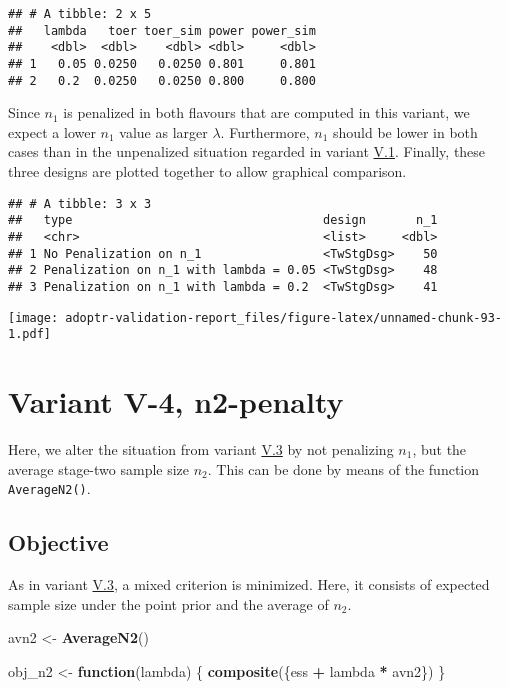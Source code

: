 \documentclass[
]{book}
\newenvironment{Shaded}{\begin{snugshade}}{\end{snugshade}}
\newcommand{\ControlFlowTok}[1]{\textcolor[rgb]{0.13,0.29,0.53}{\textbf{#1}}}
\newcommand{\KeywordTok}[1]{\textcolor[rgb]{0.13,0.29,0.53}{\textbf{#1}}}
\newcommand{\NormalTok}[1]{#1}
\newcommand{\OperatorTok}[1]{\textcolor[rgb]{0.81,0.36,0.00}{\textbf{#1}}}
\newcommand{\StringTok}[1]{\textcolor[rgb]{0.31,0.60,0.02}{#1}}
\begin{document}
\begin{verbatim}
## # A tibble: 2 x 5
##   lambda   toer toer_sim power power_sim
##    <dbl>  <dbl>    <dbl> <dbl>     <dbl>
## 1   0.05 0.0250   0.0250 0.801     0.801
## 2   0.2  0.0250   0.0250 0.800     0.800
\end{verbatim}

Since \(n_1\) is penalized in both flavours that are computed in this variant,
we expect a lower \(n_1\) value as larger \(\lambda\).
Furthermore, \(n_1\) should be lower in both cases than in the unpenalized
situation regarded in variant \protect\hyperlink{variantV_1}{V.1}.
Finally, these three designs are plotted together to allow graphical comparison.

\begin{verbatim}
## # A tibble: 3 x 3
##   type                                   design       n_1
##   <chr>                                  <list>     <dbl>
## 1 No Penalization on n_1                 <TwStgDsg>    50
## 2 Penalization on n_1 with lambda = 0.05 <TwStgDsg>    48
## 3 Penalization on n_1 with lambda = 0.2  <TwStgDsg>    41
\end{verbatim}

\texttt{[image: adoptr-validation-report\_files/figure-latex/unnamed-chunk-93-1.pdf]}

\hypertarget{variantV_4}{%
\section{Variant V-4, n2-penalty}\label{variantV_4}}

Here, we alter the situation from variant \protect\hyperlink{variantV_3}{V.3} by not penalizing
\(n_1\), but the average stage-two sample size \(n_2\).
This can be done by means of the function \texttt{AverageN2()}.

\hypertarget{objective-13}{%
\subsection{Objective}\label{objective-13}}

As in variant \protect\hyperlink{variantV_3}{V.3}, a mixed criterion is minimized.
Here, it consists of expected sample size under the point prior and the
average of \(n_2\).

\begin{Shaded}
\begin{Highlighting}[]
\NormalTok{avn2 <-}\StringTok{ }\KeywordTok{AverageN2}\NormalTok{()}

\NormalTok{obj_n2 <-}\StringTok{ }\ControlFlowTok{function}\NormalTok{(lambda) \{}
  \KeywordTok{composite}\NormalTok{(\{ess }\OperatorTok{+}\StringTok{ }\NormalTok{lambda }\OperatorTok{*}\StringTok{ }\NormalTok{avn2\})}
\NormalTok{\}}
\end{Highlighting}
\end{Shaded}
\end{document}
